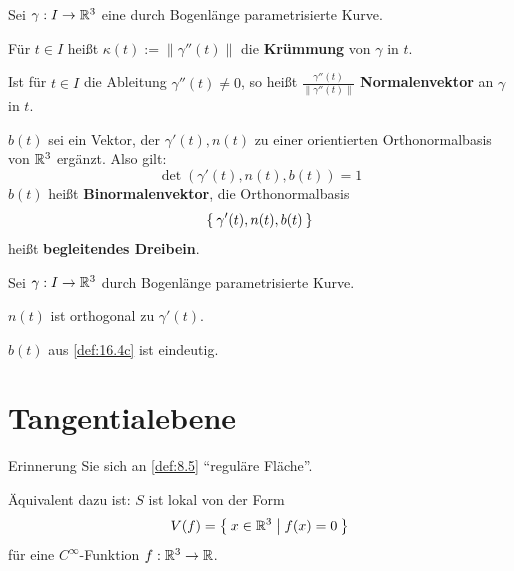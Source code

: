 \begin{definition}%
    Sei $\gamma: I \rightarrow \mathbb{R}^3$ eine durch Bogenlänge parametrisierte
    Kurve.

    \begin{defenum}
        \item Für $t \in I$ heißt $\kappa(t) := \|\gamma''(t)\|$ die
              \textbf{Krümmung} von $\gamma$ in $t$.
        \item Ist für $t \in I$ die Ableitung $\gamma''(t) \neq 0$,
              so heißt $\frac{\gamma''(t)}{\|\gamma''(t)\|}$ \textbf{Normalenvektor}
              an $\gamma$ in $t$.
        \item \label{def:16.4c} $b(t)$ sei ein Vektor, der $\gamma'(t), n(t)$
              zu einer orientierten Orthonormalbasis von $\mathbb{R}^3$ ergänzt.
              Also gilt:
              \[\det(\gamma'(t), n(t), b(t)) = 1\]
              $b(t)$ heißt \textbf{Binormalenvektor},
              die Orthonormalbasis
              \[\Set{\gamma'(t), n(t), b(t)}\]
              heißt \textbf{begleitendes Dreibein}.
    \end{defenum}
\end{definition}

\begin{bemerkung}%
    Sei $\gamma: I \rightarrow \mathbb{R}^3$ durch Bogenlänge parametrisierte
    Kurve.

    \begin{bemenum}
        \item $n(t)$ ist orthogonal zu $\gamma'(t)$.
        \item $b(t)$ aus \cref{def:16.4c} ist eindeutig.
    \end{bemenum}
\end{bemerkung}

\section{Tangentialebene}
Erinnerung Sie sich an \cref{def:8.5} \enquote{reguläre Fläche}.

Äquivalent dazu ist: $S$ ist lokal von der Form
\[V(f) = \Set{x \in \ensuremath{\mathbb{R}}^3 | f(x) = 0 }\]
für eine $C^\infty$-Funktion $f: \mathbb{R}^3 \rightarrow \mathbb{R}$.

